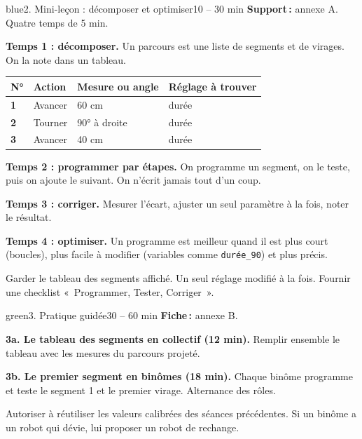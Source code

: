 \documentclass[11pt,a4paper]{article}
\begin{document}
\begin{etape}{blue}{2. Mini-leçon : décomposer et optimiser}{10 -- 30 min}
\textbf{Support\,:} annexe A. Quatre temps de 5 min.

\textbf{Temps 1 : décomposer.} Un parcours est une liste de segments et de virages. On la note dans un tableau.

\begin{center}
\begin{tabularx}{\linewidth}{>{\bfseries}p{1.6cm}Y Y Y}
\toprule
N° & Action & Mesure ou angle & Réglage à trouver\\
 & Avancer & 60 cm & durée\\
2 & Tourner & 90° à droite & durée\\
3 & Avancer & 40 cm & durée\\
\bottomrule
\end{tabularx}
\end{center}

\textbf{Temps 2 : programmer par étapes.} On programme un segment, on le teste, puis on ajoute le suivant. On n'écrit jamais tout d'un coup.

\textbf{Temps 3 : corriger.} Mesurer l'écart, ajuster un seul paramètre à la fois, noter le résultat.

\textbf{Temps 4 : optimiser.} Un programme est meilleur quand il est plus court (boucles), plus facile à modifier (variables comme \texttt{durée\_90}) et plus précis.

\begin{astuce}
Garder le tableau des segments affiché. Un seul réglage modifié à la fois. Fournir une checklist «~Programmer, Tester, Corriger~».
\end{astuce}
\end{etape}

\begin{etape}{green}{3. Pratique guidée}{30 -- 60 min}
\textbf{Fiche\,:} annexe B.

\textbf{3a. Le tableau des segments en collectif (12 min).} Remplir ensemble le tableau avec les mesures du parcours projeté.

\textbf{3b. Le premier segment en binômes (18 min).} Chaque binôme programme et teste le segment 1 et le premier virage. Alternance des rôles.


\begin{astuce}
Autoriser à réutiliser les valeurs calibrées des séances précédentes. Si un binôme a un robot qui dévie, lui proposer un robot de rechange.
\end{astuce}
\end{etape}
\end{document}
